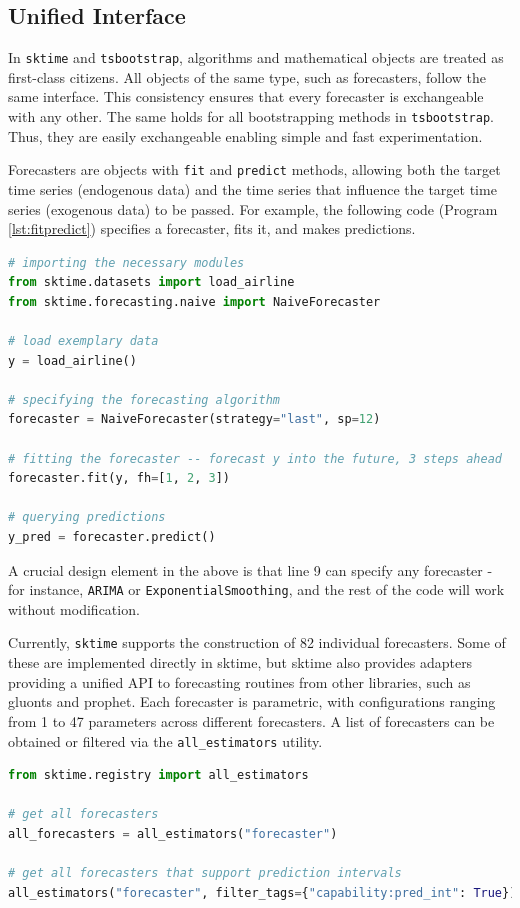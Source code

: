 \subsection{Unified Interface}
In \texttt{sktime} and \texttt{tsbootstrap}, algorithms and mathematical objects are treated as first-class citizens. All objects of the same type, such as forecasters, follow the same interface. This consistency ensures that every forecaster is exchangeable with any other. The same holds for all bootstrapping methods in \texttt{tsbootstrap}. Thus, they are easily exchangeable enabling simple and fast experimentation.

Forecasters are objects with \texttt{fit} and \texttt{predict} methods, allowing both the target time series (endogenous data) and the time series that influence the target time series (exogenous data) to be passed. For example, the following code (Program \ref{lst:fitpredict}) specifies a forecaster, fits it, and makes predictions.

\begin{lstlisting}[language=Python, caption=Exemplary code for fitting and predicting with a forecaster, label=lst:fitpredict]
# importing the necessary modules
from sktime.datasets import load_airline
from sktime.forecasting.naive import NaiveForecaster

# load exemplary data
y = load_airline()

# specifying the forecasting algorithm
forecaster = NaiveForecaster(strategy="last", sp=12)

# fitting the forecaster -- forecast y into the future, 3 steps ahead
forecaster.fit(y, fh=[1, 2, 3])

# querying predictions
y_pred = forecaster.predict()
\end{lstlisting}

A crucial design element in the above is that line 9 can specify any forecaster - for instance, \texttt{ARIMA} or \texttt{ExponentialSmoothing},
and the rest of the code will work without modification.

Currently, \texttt{sktime} supports the construction of 82 individual forecasters.
Some of these are implemented directly in sktime, but sktime also provides adapters providing a unified API to forecasting routines from other libraries, such as gluonts and prophet.
Each forecaster is parametric, with configurations ranging from 1 to 47 parameters across different forecasters. A list of forecasters can be obtained or filtered via the \texttt{all\_estimators} utility.
\begin{lstlisting}[language=Python, caption=Code to list all forecaster and all probabilistic forecasters (tag=capability:pred_int), label=lst:allforecasters]
from sktime.registry import all_estimators

# get all forecasters
all_forecasters = all_estimators("forecaster")

# get all forecasters that support prediction intervals
all_estimators("forecaster", filter_tags={"capability:pred_int": True})
\end{lstlisting}

